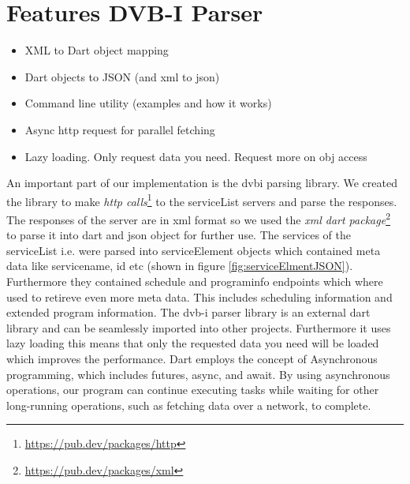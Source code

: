 \documentclass[conference]{IEEEtran}
\begin{document}
\section{Features DVB-I Parser}


\begin{itemize}
	\item XML to Dart object mapping
	\item Dart objects to JSON (and xml to json)
	\item Command line utility (examples and how it works)
	\item Async http request for parallel fetching
	\item Lazy loading. Only request data you need. Request more on obj access
\end{itemize}


An important part of our implementation is the dvbi parsing library. We created the library to make \emph{http calls}\footnote{\url{https://pub.dev/packages/http}} to the serviceList servers and parse the responses. The responses of the server are in xml format so we used the \emph{xml dart package}\footnote{\url{https://pub.dev/packages/xml}} to parse it into dart and json object for further use. The services of the serviceList i.e.  were parsed into serviceElement objects which contained meta data like servicename, id etc (shown in figure \ref{fig:serviceElmentJSON}). Furthermore they contained schedule and programinfo endpoints which where used to retireve even more meta data. This includes scheduling information and extended program information. The dvb-i parser library is an external dart library and can be seamlessly imported into other projects. Furthermore it uses lazy loading this means that only the requested data you need will be loaded which improves the performance. Dart employs the concept of Asynchronous programming, which includes futures, async, and await. By using asynchronous operations, our program can continue executing tasks while waiting for other long-running operations, such as fetching data over a network, to complete.








\end{document}
